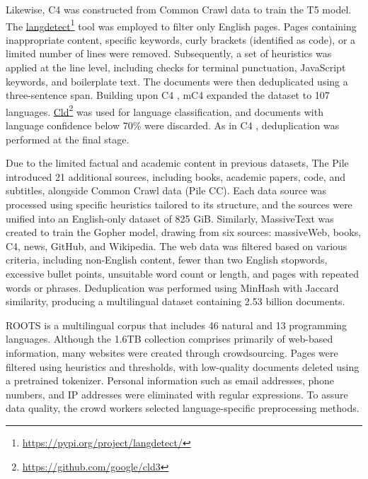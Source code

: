 Likewise, C4 \citep{raffel2020c4} was constructed from Common Crawl data to train the T5 model. The \href{https://pypi.org/project/langdetect/}{langdetect}\footnote{\href{https://pypi.org/project/langdetect/}{https://pypi.org/project/langdetect/}} tool was employed to filter only English pages. Pages containing inappropriate content, specific keywords, curly brackets (identified as code), or a limited number of lines were removed. Subsequently, a set of heuristics was applied at the line level, including checks for terminal punctuation, JavaScript keywords, and boilerplate text. The documents were then deduplicated using a three-sentence span. Building upon C4 \citep{raffel2020c4}, mC4 \citep{xue2020mt5} expanded the dataset to 107 languages. \href{https://github.com/google/cld3}{Cld}\footnote{\href{https://github.com/google/cld3}{https://github.com/google/cld3}} was used for language classification, and documents with language confidence below 70\% were discarded. As in C4 \citep{raffel2020c4}, deduplication was performed at the final stage.

Due to the limited factual and academic content in previous datasets, The Pile \citep{gao2020pile} introduced 21 additional sources, including books, academic papers, code, and subtitles, alongside Common Crawl data (Pile CC). Each data source was processed using specific heuristics tailored to its structure, and the sources were unified into an English-only dataset of 825 GiB. Similarly, MassiveText \citep{muennighoff2022massiveText} was created to train the Gopher model, drawing from six sources: massiveWeb, books, C4, news, GitHub, and Wikipedia. The web data was filtered based on various criteria, including non-English content, fewer than two English stopwords, excessive bullet points, unsuitable word count or length, and pages with repeated words or phrases. Deduplication was performed using MinHash \citep{broder1997minhash} with Jaccard similarity, producing a multilingual dataset containing 2.53 billion documents.

ROOTS \citep{laurenccon2022roots} is a multilingual corpus that includes 46 natural and 13 programming languages. Although the 1.6TB collection comprises primarily of web-based information, many websites were created through crowdsourcing. Pages were filtered using heuristics and thresholds, with low-quality documents deleted using a pretrained tokenizer. Personal information such as email addresses, phone numbers, and IP addresses were eliminated with regular expressions. To assure data quality, the crowd workers selected language-specific preprocessing methods.

